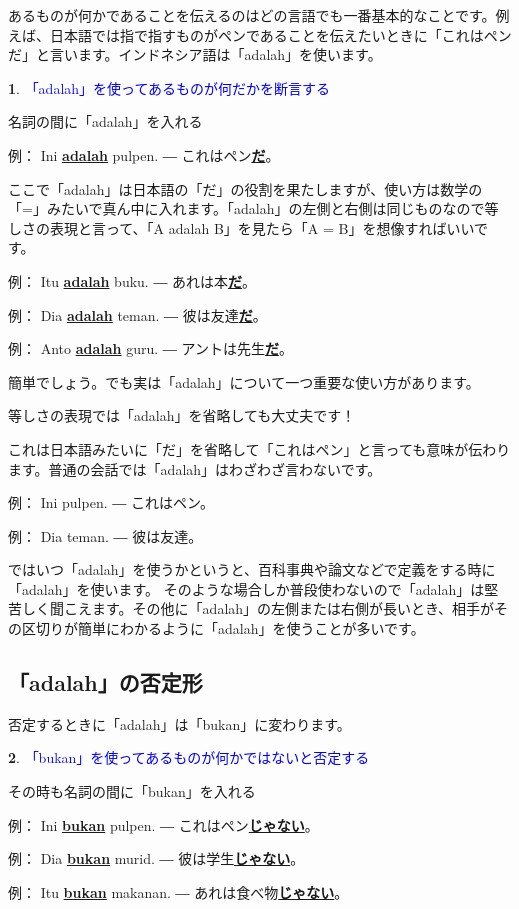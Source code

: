 \documentclass[uplatex]{jsarticle}
\theoremstyle{definition}
\newtheorem*{grammarpoint*}{}
\newcommand{\grammarpoint}[1]{
\begin{grammarpoint*}
  \textcolor{blue}{#1}
\end{grammarpoint*}
}
\newcommand{\example}[2]{
例： #1 ― #2
}
\newcommand{\bu}[1]{\underline{\textbf{#1}}}
\newcommand{\bi}[1]{\bu{#1}}
\newcommand{\bj}[1]{\bu{#1}}
\begin{document}
あるものが何かであることを伝えるのはどの言語でも一番基本的なことです。例えば、日本語では指で指すものがペンであることを伝えたいときに「これはペンだ」と言います。インドネシア語は「adalah」を使います。

\grammarpoint{「adalah」を使ってあるものが何だかを断言する}

名詞の間に「adalah」を入れる

\example{Ini \bi{adalah} pulpen. }{これはペン\bj{だ}。}

ここで「adalah」は日本語の「だ」の役割を果たしますが、使い方は数学の「=」みたいで真ん中に入れます。「adalah」の左側と右側は同じものなので等しさの表現と言って、「A
adalah B」を見たら「A = B」を想像すればいいです。

\example{Itu \bi{adalah} buku.}{あれは本\bj{だ}。}

\example{Dia \bi{adalah} teman.}{彼は友達\bj{だ}。}

\example{Anto \bi{adalah} guru. }{アントは先生\bj{だ}。}

簡単でしょう。でも実は「adalah」について一つ重要な使い方があります。

等しさの表現では「adalah」を省略しても大丈夫です！

これは日本語みたいに「だ」を省略して「これはペン」と言っても意味が伝わります。普通の会話では「adalah」はわざわざ言わないです。

\example{Ini pulpen.}{これはペン。}

\example{Dia teman. }{彼は友達。}

ではいつ「adalah」を使うかというと、百科事典や論文などで定義をする時に「adalah」を使います。
そのような場合しか普段使わないので「adalah」は堅苦しく聞こえます。その他に「adalah」の左側または右側が長いとき、相手がその区切りが簡単にわかるように「adalah」を使うことが多いです。

\subsection*{「adalah」の否定形}

否定するときに「adalah」は「bukan」に変わります。

\grammarpoint{「bukan」を使ってあるものが何かではないと否定する}

その時も名詞の間に「bukan」を入れる

\example{Ini \bi{bukan} pulpen.}{これはペン\bj{じゃない}。}

\example{Dia \bi{bukan} murid. }{彼は学生\bj{じゃない}。}

\example{Itu \bi{bukan} makanan. }{あれは食べ物\bj{じゃない}。}
\end{document}
